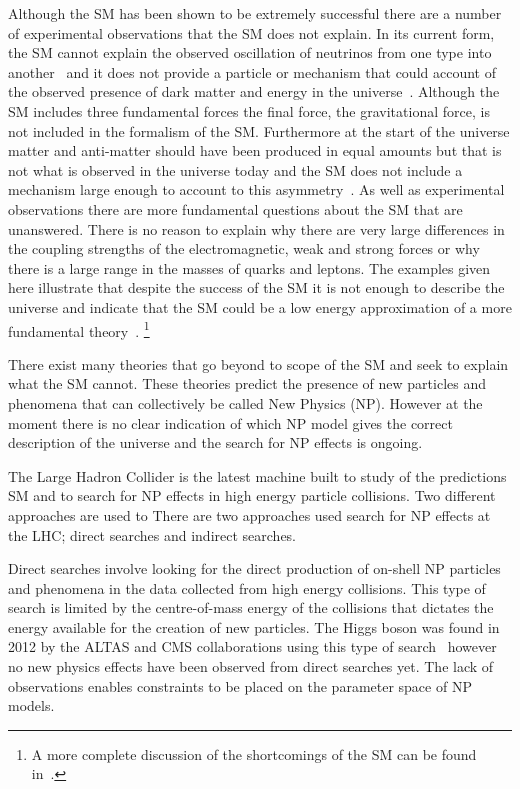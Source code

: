 Although the SM has been shown to be extremely successful there are a number of experimental observations that the SM does not explain. In its current form, the SM cannot explain the observed oscillation of neutrinos from one type into another~\cite{PhysRevLett.20.1205,Fukuda:1998fd, PhysRevLett.86.5656,PhysRevLett.87.071301} and it does not provide a particle or mechanism that could account of the observed presence of dark matter and energy in the universe~\cite{darkmatter1,darkmatter2,Dunkley:2008ie,Ade:2015xua}. Although the SM includes three fundamental forces the final force, the gravitational force, is not included in the formalism of the SM. Furthermore at the start of the universe matter and anti-matter should have been produced in equal amounts but that is not what is observed in the universe today and the SM does not include a mechanism large enough to account to this asymmetry~\cite{Sakharov:1967dj,Gavela:1993ts}.
As well as experimental observations there are more fundamental questions about the SM that are unanswered. There is no reason to explain why there are very large differences in the coupling strengths of the electromagnetic, weak and strong forces or why there is a large range in the masses of quarks and leptons.
The examples given here illustrate that despite the success of the SM it is not enough to describe the universe and indicate that the SM could be a low energy approximation of a more fundamental theory~\cite{lowenergySM}. \footnote{A more complete discussion of the shortcomings of the SM can be found in~\cite{Ellis:2002wba}.}

There exist many theories that go beyond to scope of the SM and seek to explain what the SM cannot. These theories predict the presence of new particles and phenomena that can collectively be called New Physics (NP). However at the moment there is no clear indication of which NP model gives the correct description of the universe and the search for NP effects is ongoing.

The Large Hadron Collider is the latest machine built to study of the predictions SM and to search for NP effects in high energy particle collisions. Two different approaches are used to There are two approaches used search for NP effects at the LHC; direct searches and indirect searches.




Direct searches involve looking for the direct production of on-shell NP particles and phenomena in the data collected from high energy collisions. 
This type of search is limited by the centre-of-mass energy of the collisions that dictates the energy available for the creation of new particles. 
The Higgs boson was found in 2012 by the ALTAS and CMS collaborations using this type of search~\cite{Chatrchyan:2012xdj,Aad:2012tfa} however no new physics effects have been observed from direct searches yet. The lack of observations enables constraints to be placed on the parameter space of NP models.


